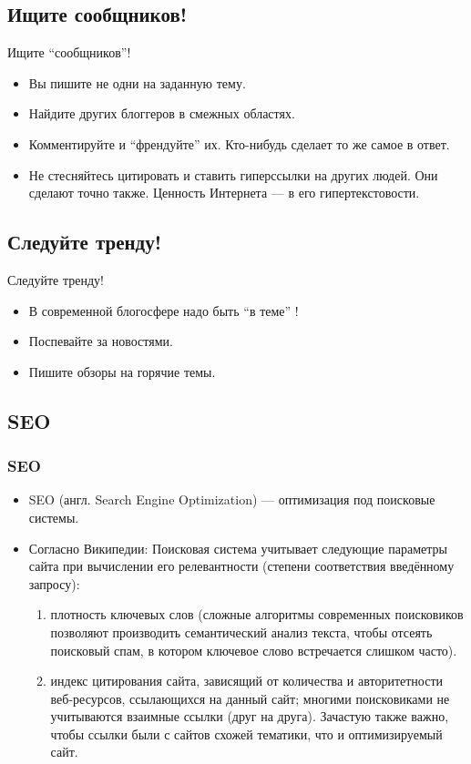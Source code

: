 \documentclass[compress,red]{beamer}
\begin{document}
\subsection{Ищите сообщников!}
\begin{frame}
	\begin{center}
	\huge{Ищите ``сообщников''!}
	\end{center}
	\begin{itemize}
		\item Вы пишите не одни на заданную тему.
		\item Найдите других блоггеров в смежных областях.
		\item Комментируйте и ``френдуйте'' их. Кто-нибудь сделает то же самое в ответ.
		\item Не стесняйтесь цитировать и ставить гиперссылки на других людей. Они сделают точно также. Ценность Интернета --- в его гипертекстовости.
	\end{itemize}
\end{frame}

\subsection{Следуйте тренду!}
\begin{frame}
	\begin{center}
	\huge{Следуйте тренду!}
	\end{center}
	\begin{itemize}
		\item В современной блогосфере надо быть ``в теме'' !
		\item Поспевайте за новостями. 
		\item Пишите обзоры на горячие темы.
	\end{itemize}
\end{frame}

\subsection{SEO}
\begin{frame}
	\frametitle{SEO}
	\begin{itemize}
		\item SEO (англ. Search Engine Optimization) --- оптимизация под поисковые системы.
		\item Согласно Википедии: Поисковая система учитывает следующие параметры сайта при вычислении его релевантности (степени соответствия введённому запросу):
			\begin{enumerate}
				\item плотность ключевых слов (сложные алгоритмы современных поисковиков позволяют производить семантический анализ текста, чтобы отсеять поисковый спам, в котором ключевое слово встречается слишком часто).
				\item индекс цитирования сайта, зависящий от количества и авторитетности веб-ресурсов, ссылающихся на данный сайт; многими поисковиками не учитываются взаимные ссылки (друг на друга). Зачастую также важно, чтобы ссылки были с сайтов схожей тематики, что и оптимизируемый сайт.
			\end{enumerate}
	\end{itemize}
\end{frame}
\end{document}
